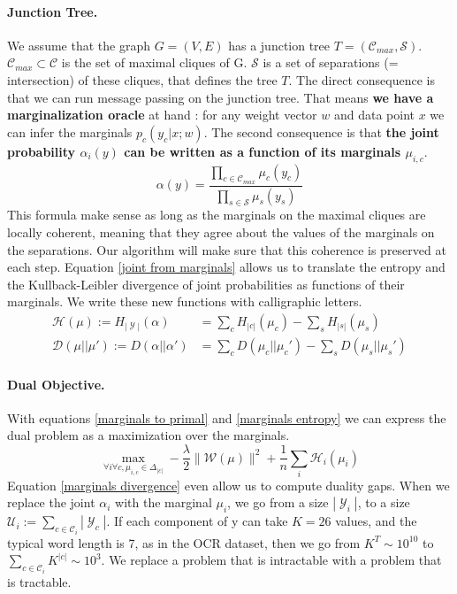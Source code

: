 \documentclass{article}
\DeclareMathOperator{\1}{\mathbb{1}}
\DeclareMathOperator{\Y}{\mathcal{Y}}
\begin{document}
\paragraph{Junction Tree.}
We assume that the graph $G=(V,E)$ has a junction tree $T=(\mathcal C_{max},\mathcal{S})$.
$\mathcal C_{max} \subset \mathcal C $ is the set of maximal cliques of G.
$\mathcal S$ is a set of separations (= intersection) of these cliques, that defines the tree $T$.
The direct consequence is that we can run message passing on the junction tree.
That means \textbf{we have a marginalization oracle} at hand : for any weight vector $w$ and data point $x$ we can infer the marginals $p_c(y_c |x ; w)$.
The second consequence is that \textbf{the joint probability $\alpha_i(y)$ can be written as a function of its marginals $\mu_{i, c}$}.
\begin{equation}
	\label{joint from marginals}
	\alpha(y) = \frac{\prod_{c\in\mathcal{C}_{max}} \mu_c(y_c)}{\prod_{s\in\mathcal{S}} \mu_s(y_s)}
\end{equation}
This formula make sense as long as the marginals on the maximal cliques are locally coherent, meaning that they agree about the values of the marginals on the separations.
Our algorithm will make sure that this coherence is preserved at each step.
Equation \ref{joint from marginals} allows us to translate the entropy and the Kullback-Leibler divergence of joint probabilities as functions of their marginals. We write these new functions with calligraphic letters.
\begin{align}
	\label{marginals entropy}
	\mathcal H (\mu) := H_{|\Y|} (\alpha) & = \sum_c H_{|c|}(\mu_c) - \sum_s H_{|s|}(\mu_s) \\
	\label{marginals divergence}
	\mathcal D (\mu||\mu') := D(\alpha||\alpha') & = \sum_c D(\mu_c||\mu_c') - \sum_s D(\mu_s||\mu_s')
\end{align}


\paragraph{Dual Objective.}
With equations \ref{marginals to primal} and \ref{marginals entropy} we can express the dual problem as a maximization over the marginals.
\begin{equation}
	\max_{\forall i \forall c, \mu_{i, c} \in \Delta_{|c|} } - \frac{\lambda}{2} \| \mathcal W(\mu)\|^2 + \frac{1}{n} \sum_i \mathcal H _ i(\mu_i)
\end{equation}
Equation \ref{marginals divergence} even allow us to compute duality gaps.
When we replace the joint $\alpha_i$ with the marginal $\mu_i$, we go from a size $|\Y_i|$, to a size $\mathcal U_i := \sum_{c \in \mathcal C_i} |\Y_c|$.
If each component of y can take $K=26$ values, and the typical word length is 7, as in the OCR dataset, then we go from $K^T \sim 10^{10}$ to $\sum_{c \in \mathcal C_i} K^{|c|} \sim 10^3$.
We replace a problem that is intractable with a problem that is tractable.
\end{document}
